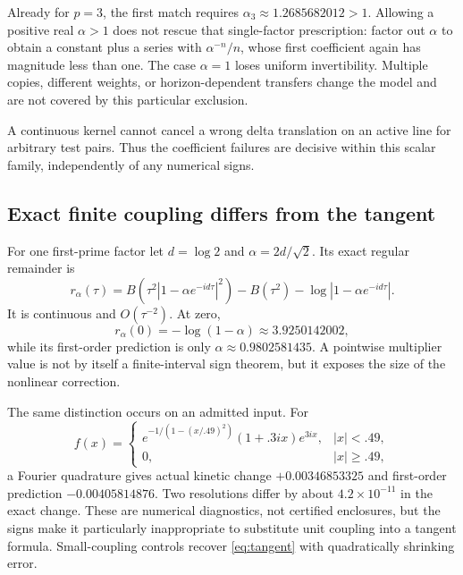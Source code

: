 \documentclass[11pt]{article}
\numberwithin{equation}{section}
\theoremstyle{definition}
\theoremstyle{remark}
\begin{document}
Already for $p=3$, the first match requires $\alpha_3\approx1.2685682012>1$. Allowing a positive real $\alpha>1$ does not rescue that single-factor prescription: factor out $\alpha$ to obtain a constant plus a series with $\alpha^{-n}/n$, whose first coefficient again has magnitude less than one. The case $\alpha=1$ loses uniform invertibility. Multiple copies, different weights, or horizon-dependent transfers change the model and are not covered by this particular exclusion.

A continuous kernel cannot cancel a wrong delta translation on an active line for arbitrary test pairs. Thus the coefficient failures are decisive within this scalar family, independently of any numerical signs.

\subsection{Exact finite coupling differs from the tangent}
For one first-prime factor let $d=\log2$ and $\alpha=2d/\sqrt2$. Its exact regular remainder is
\begin{equation}
 r_\alpha(\tau)=B(\tau^2|1-\alpha e^{-id\tau}|^2)
 -B(\tau^2)-\log|1-\alpha e^{-id\tau}|.
 \label{eq:ralpha}
\end{equation}
It is continuous and $O(\tau^{-2})$. At zero,
\begin{equation}
 r_\alpha(0)=-\log(1-\alpha)\approx3.9250142002,
\end{equation}
while its first-order prediction is only $\alpha\approx0.9802581435$. A pointwise multiplier value is not by itself a finite-interval sign theorem, but it exposes the size of the nonlinear correction.

The same distinction occurs on an admitted input. For
\begin{equation}
 f(x)=
 \begin{cases}
 e^{-1/(1-(x/.49)^2)}(1+.3ix)e^{3ix},&|x|<.49,\\
 0,&|x|\ge.49,
 \end{cases}
 \label{eq:bump}
\end{equation}
a Fourier quadrature gives actual kinetic change $+0.00346853325$ and first-order prediction $-0.00405814876$. Two resolutions differ by about $4.2\times10^{-11}$ in the exact change. These are numerical diagnostics, not certified enclosures, but the signs make it particularly inappropriate to substitute unit coupling into a tangent formula. Small-coupling controls recover \eqref{eq:tangent} with quadratically shrinking error.
\end{document}
